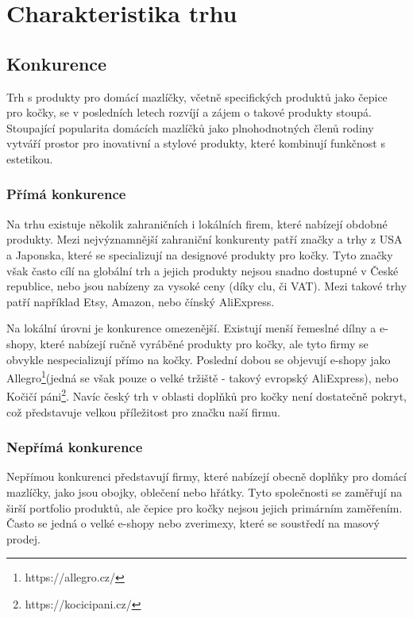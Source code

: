 \documentclass[12pt, a4paper]{article}
\begin{document}
\pagebreak

\section{Charakteristika trhu}
\subsection{Konkurence}

Trh s produkty pro domácí mazlíčky, včetně specifických produktů jako čepice pro kočky, se v posledních letech rozvíjí a zájem o takové produkty stoupá.
Stoupající popularita domácích mazlíčků jako plnohodnotných členů rodiny vytváří prostor pro inovativní a stylové produkty, které kombinují funkčnost s estetikou.

\subsubsection{Přímá konkurence\cite{prima-konkurence}}
Na trhu existuje několik zahraničních i lokálních firem, které nabízejí obdobné produkty.
Mezi nejvýznamnější zahraniční konkurenty patří značky a trhy z USA a Japonska, které se specializují na designové produkty pro kočky.
Tyto značky však často cílí na globální trh a jejich produkty nejsou snadno dostupné v České republice, nebo jsou nabízeny za vysoké ceny
(díky clu, či VAT). Mezi takové trhy patří například Etsy, Amazon, nebo čínský AliExpress.

Na lokální úrovni je konkurence omezenější.
Existují menší řemeslné dílny a e-shopy, které nabízejí ručně vyráběné produkty pro kočky, ale tyto firmy se obvykle nespecializují přímo na kočky.
Poslední dobou se objevují e-shopy jako Allegro\footnote{https://allegro.cz/}(jedná se však pouze o velké tržiště - takový evropský AliExpress), nebo Kočičí páni\footnote{https://kocicipani.cz/}.
Navíc český trh v oblasti doplňků pro kočky není dostatečně pokryt, což představuje velkou příležitost pro značku naší firmu.

\subsubsection{Nepřímá konkurence\cite{neprima-konkurence}}
Nepřímou konkurenci představují firmy, které nabízejí obecně doplňky pro domácí mazlíčky, jako jsou obojky, oblečení nebo hřátky.
Tyto společnosti se zaměřují na širší portfolio produktů, ale čepice pro kočky nejsou jejich primárním zaměřením. Často se jedná o velké e-shopy nebo zverimexy, které se soustředí na masový prodej.
\end{document}
